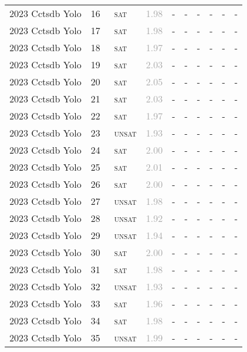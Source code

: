 \begin{center}
{\begin{longtable}{@{}llllllllll@{}}
2023 Cctsdb Yolo & 16 & ~\textsc{sat} & \textcolor{darkgray}{1.98} & - & - & - & - & - & - \\
2023 Cctsdb Yolo & 17 & ~\textsc{sat} & \textcolor{darkgray}{1.98} & - & - & - & - & - & - \\
2023 Cctsdb Yolo & 18 & ~\textsc{sat} & \textcolor{darkgray}{1.97} & - & - & - & - & - & - \\
2023 Cctsdb Yolo & 19 & ~\textsc{sat} & \textcolor{darkgray}{2.03} & - & - & - & - & - & - \\
2023 Cctsdb Yolo & 20 & ~\textsc{sat} & \textcolor{darkgray}{2.05} & - & - & - & - & - & - \\
2023 Cctsdb Yolo & 21 & ~\textsc{sat} & \textcolor{darkgray}{2.03} & - & - & - & - & - & - \\
2023 Cctsdb Yolo & 22 & ~\textsc{sat} & \textcolor{darkgray}{1.97} & - & - & - & - & - & - \\
2023 Cctsdb Yolo & 23 & ~\textsc{unsat} & \textcolor{darkgray}{1.93} & - & - & - & - & - & - \\
2023 Cctsdb Yolo & 24 & ~\textsc{sat} & \textcolor{darkgray}{2.00} & - & - & - & - & - & - \\
2023 Cctsdb Yolo & 25 & ~\textsc{sat} & \textcolor{darkgray}{2.01} & - & - & - & - & - & - \\
2023 Cctsdb Yolo & 26 & ~\textsc{sat} & \textcolor{darkgray}{2.00} & - & - & - & - & - & - \\
2023 Cctsdb Yolo & 27 & ~\textsc{unsat} & \textcolor{darkgray}{1.98} & - & - & - & - & - & - \\
2023 Cctsdb Yolo & 28 & ~\textsc{unsat} & \textcolor{darkgray}{1.92} & - & - & - & - & - & - \\
2023 Cctsdb Yolo & 29 & ~\textsc{unsat} & \textcolor{darkgray}{1.94} & - & - & - & - & - & - \\
2023 Cctsdb Yolo & 30 & ~\textsc{sat} & \textcolor{darkgray}{2.00} & - & - & - & - & - & - \\
2023 Cctsdb Yolo & 31 & ~\textsc{sat} & \textcolor{darkgray}{1.98} & - & - & - & - & - & - \\
2023 Cctsdb Yolo & 32 & ~\textsc{unsat} & \textcolor{darkgray}{1.93} & - & - & - & - & - & - \\
2023 Cctsdb Yolo & 33 & ~\textsc{sat} & \textcolor{darkgray}{1.96} & - & - & - & - & - & - \\
2023 Cctsdb Yolo & 34 & ~\textsc{sat} & \textcolor{darkgray}{1.98} & - & - & - & - & - & - \\
2023 Cctsdb Yolo & 35 & ~\textsc{unsat} & \textcolor{darkgray}{1.99} & - & - & - & - & - & - \\

\end{longtable}}
\end{center}
